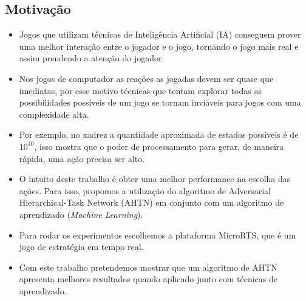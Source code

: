 \documentclass[a0,portrait]{a0poster}
\begin{document}

\begin{multicols}{2} 
\color{NavyBlue}
\color{Black}
\raggedright
\Large

\newcommand\itemadjust{\itemsep.5em \parskip0pt \parsep0pt}
\color{NavyBlue}
\section*{\huge Motiva\c{c}\~ao}
\color{Black}

\begin{itemize}
	[leftmargin=2em]\itemadjust
	\item Jogos que utilizam t\'écnicas de Inteligência Artificial (IA) conseguem prover uma melhor intera\c{c}\~ao entre o jogador e o jogo, tornando o jogo mais real e assim prendendo a aten\c{c}\~ao do jogador.
	\item Nos jogos de computador as rea\c{c}\~oes as jogadas devem ser quase que imediatas, por esse motivo t\'ecnicas que tentam explorar todas as possibilidades poss\'iveis de um jogo se tornam invi\'aveis para jogos com uma complexidade alta.
	\item Por exemplo, no xadrez a quantidade aproximada de estados poss\'iveis \'e de $10^{40}$, isso mostra que o poder de processamento para gerar, de maneira r\'apida, uma a\c{c}\~ao precisa ser alto. 
	\item O intuito deste trabalho é obter uma melhor performance na escolha das ações. Para isso, propomos a utilização do algoritmo de Adversarial Hierarchical-Task Network (AHTN) em conjunto com um algoritmo de aprendizado (\textit{Machine Learning}).
	\item Para rodar os experimentos escolhemos a plataforma MicroRTS, que é um jogo de estratégia em tempo real. 
	\item Com este trabalho pretendemos mostrar que um algoritmo de AHTN apresenta melhores resultados quando aplicado junto com técnicas de aprendizado. 
\end{itemize}



\color{NavyBlue}

\end{multicols}
\end{document}
